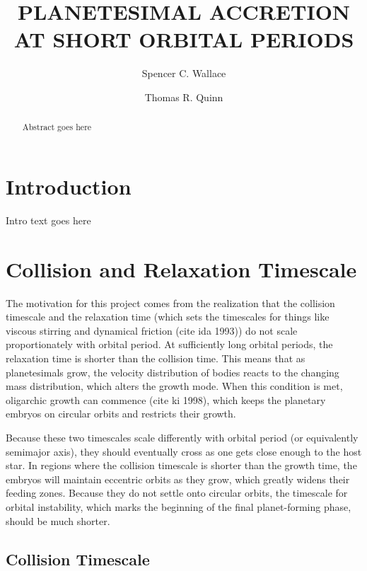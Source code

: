 \documentclass[onecolumn]{aastex63}
\begin{document}
\title{PLANETESIMAL ACCRETION AT SHORT ORBITAL PERIODS}

\author{Spencer C. Wallace}


\author{Thomas R. Quinn}

\begin{abstract}
Abstract goes here
\end{abstract}

\section{Introduction} \label{sec:intro}

Intro text goes here \citep{Wallace2019}

\section{Collision and Relaxation Timescale}

The motivation for this project comes from the realization that the collision timescale and the relaxation time (which sets the timescales for things like viscous stirring and dynamical friction (cite ida 1993)) do not scale proportionately with orbital period. At sufficiently long orbital periods, the relaxation time is shorter than the collision time. This means that as planetesimals grow, the velocity distribution of bodies reacts to the changing mass distribution, which alters the growth mode. When this condition is met, oligarchic growth can commence (cite ki 1998), which keeps the planetary embryos on circular orbits and restricts their growth.

Because these two timescales scale differently with orbital period (or equivalently semimajor axis), they should eventually cross as one gets close enough to the host star. In regions where the collision timescale is shorter than the growth time, the embryos will maintain eccentric orbits as they grow, which greatly widens their feeding zones. Because they do not settle onto circular orbits, the timescale for orbital instability, which marks the beginning of the final planet-forming phase, should be much shorter.

\subsection{Collision Timescale}
\end{document}
